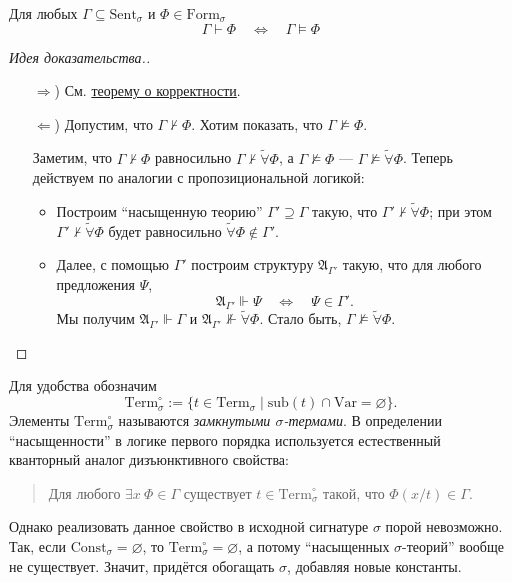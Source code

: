 \documentclass[12pt,a4paper]{article}
\newcommand{\Formul}{\ensuremath{\mathrm{Form}}\xspace}
\newcommand{\Const}{\ensuremath{\mathrm{Const}}\xspace}
\newcommand{\Var}{\ensuremath{\mathrm{Var}}\xspace}
\newcommand{\Term}{\ensuremath{\mathrm{Term}}\xspace}
\newcommand{\sub}{\ensuremath{\mathrm{sub}}\xspace}
\newcommand{\Sent}{\ensuremath{\mathrm{Sent}}\xspace}
\newcommand{\tildeforall}{\widetilde{\forall}}
\begin{document}
    \begin{theorem}
        Для любых $\Gamma \subseteq \Sent_\sigma$ и $\Phi \in \Formul_\sigma$
        \[
            \Gamma \vdash \Phi
            \quad \Longleftrightarrow \quad
            \Gamma \vDash \Phi
        \]
    \end{theorem}

    \begin{proof}[Идея доказательства.]
        \begin{itemize}
            \item[$\Rightarrow$)] См. \hyperref[Hilbert-conclusion-correctness-2]{теорему о корректности}.
            \item[$\Leftarrow$)] Допустим, что $\Gamma \nvdash \Phi$. Хотим показать, что $\Gamma \nvDash \Phi$.

                Заметим, что $\Gamma \nvdash \Phi$ равносильно $\Gamma \nvdash \tildeforall \Phi$, а $\Gamma \nvDash \Phi$ --- $\Gamma \nvDash \tildeforall \Phi$. Теперь действуем по аналогии с пропозициональной логикой:
                \begin{itemize}
                    \item Построим ``насыщенную теорию'' $\Gamma' \supseteq \Gamma$ такую, что $\Gamma' \nvdash \tildeforall \Phi$; при этом $\Gamma' \nvdash \tildeforall \Phi$ будет равносильно $\tildeforall \Phi \notin \Gamma'$.
                    \item Далее, с помощью $\Gamma'$ построим структуру $\mathfrak{A}_{\Gamma'}$ такую, что для любого предложения $\Psi$,
                        \[
                            \mathfrak{A}_{\Gamma'} \Vdash \Psi
                            \quad \Longleftrightarrow \quad
                            \Psi \in \Gamma'.
                        \]
                        Мы получим $\mathfrak{A}_{\Gamma'} \Vdash \Gamma$ и $\mathfrak{A}_{\Gamma'} \nVdash \tildeforall \Phi$. Стало быть, $\Gamma \nvDash \tildeforall \Phi$.
                \end{itemize}
        \end{itemize}
    \end{proof}

    \begin{remark*}
        Для удобства обозначим
        \[\Term^\circ_\sigma := \{t \in \Term_\sigma \mid \sub(t) \cap \Var = \varnothing\}.\]
        Элементы $\Term^\circ_\sigma$ называются \emph{замкнутыми $\sigma$-термами}. В определении ``насыщенности'' в логике первого порядка используется естественный кванторный аналог дизъюнктивного свойства:
        \begin{quotation}
            Для любого $\exists x\ \Phi \in \Gamma$ существует $t \in \Term^\circ_\sigma$ такой, что $\Phi(x/t) \in \Gamma$.
        \end{quotation}
        Однако реализовать данное свойство в исходной сигнатуре $\sigma$ порой невозможно. Так, если $\Const_\sigma = \varnothing$, то $\Term^\circ_\sigma = \varnothing$, а потому ``насыщенных $\sigma$-теорий'' вообще не существует. Значит, придётся обогащать $\sigma$, добавляя новые константы.
    \end{remark*}
\end{document}
